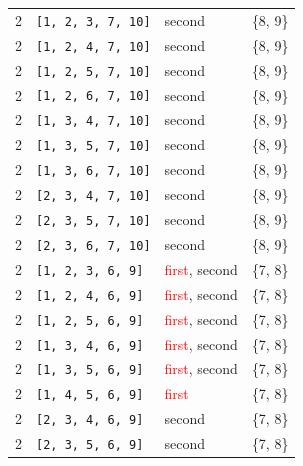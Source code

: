 \begin{longtable}{|p{2.5cm}|p{3cm}|p{2.5cm}|c|}
\rowcolor{Light_Blue}
2 & \texttt{[1, 2, 3, 7, 10]} & \textcolor{CustomBlue}{second} & \{8, 9\} \\ 
2 & \texttt{[1, 2, 4, 7, 10]} & \textcolor{CustomBlue}{second} & \{8, 9\} \\ 
2 & \texttt{[1, 2, 5, 7, 10]} & \textcolor{CustomBlue}{second} & \{8, 9\} \\ 
2 & \texttt{[1, 2, 6, 7, 10]} & \textcolor{CustomBlue}{second} & \{8, 9\} \\ 
2 & \texttt{[1, 3, 4, 7, 10]} & \textcolor{CustomBlue}{second} & \{8, 9\} \\ 
2 & \texttt{[1, 3, 5, 7, 10]} & \textcolor{CustomBlue}{second} & \{8, 9\} \\ 
2 & \texttt{[1, 3, 6, 7, 10]} & \textcolor{CustomBlue}{second} & \{8, 9\} \\ 
2 & \texttt{[2, 3, 4, 7, 10]} & \textcolor{CustomBlue}{second} & \{8, 9\} \\ 
2 & \texttt{[2, 3, 5, 7, 10]} & \textcolor{CustomBlue}{second} & \{8, 9\} \\ 
2 & \texttt{[2, 3, 6, 7, 10]} & \textcolor{CustomBlue}{second} & \{8, 9\} \\ \hline \hline

\rowcolor{Light_Blue}
2 & \texttt{[1, 2, 3, 6, 9]} & \textcolor{red}{first}, \textcolor{CustomBlue}{second} & \{7, 8\} \\ 
2 & \texttt{[1, 2, 4, 6, 9]} & \textcolor{red}{first}, \textcolor{CustomBlue}{second} & \{7, 8\} \\ 
2 & \texttt{[1, 2, 5, 6, 9]} & \textcolor{red}{first}, \textcolor{CustomBlue}{second} & \{7, 8\} \\ 
2 & \texttt{[1, 3, 4, 6, 9]} & \textcolor{red}{first}, \textcolor{CustomBlue}{second} & \{7, 8\} \\ 
2 & \texttt{[1, 3, 5, 6, 9]} & \textcolor{red}{first}, \textcolor{CustomBlue}{second} & \{7, 8\} \\ 
2 & \texttt{[1, 4, 5, 6, 9]} & \textcolor{red}{first} & \{7, 8\} \\ 
2 & \texttt{[2, 3, 4, 6, 9]} & \textcolor{CustomBlue}{second} & \{7, 8\} \\ 
2 & \texttt{[2, 3, 5, 6, 9]} & \textcolor{CustomBlue}{second} & \{7, 8\} \\ \hline \hline


\end{longtable}
